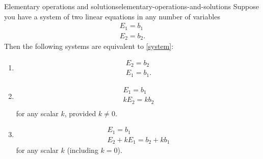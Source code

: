 \begin{theorem}{Elementary operations and solutions}{elementary-operations-and-solutions}
  Suppose you have a system of two linear equations in any number of variables
  \begin{equation}
    \begin{array}{c}
      E_1=b_1 \\
      E_2=b_2.
    \end{array} \label{system}
  \end{equation}
  Then the following systems are equivalent to \eqref{system}:
  \begin{enumerate}
  \item   \begin{equation}
      \begin{array}{c}
        E_2=b_2 \\
        E_1=b_1.
      \end{array}
      \label{thm-1.9.1}
    \end{equation}
  \item  \begin{equation}
      \begin{array}{c}
        E_1=b_1 \\
        kE_2=kb_2 \\
      \end{array}
      \label{thm-1.9.2}
    \end{equation}
    for any scalar $k$, provided $k\neq0$.
  \item \begin{equation}
      \begin{array}{c}
        E_1=b_1 \\
        E_2+kE_1=b_2+kb_1
      \end{array}
      \label{thm-1.9.3}
    \end{equation}
    for any scalar $k$ (including $k=0$).

  \end{enumerate}
\end{theorem}

